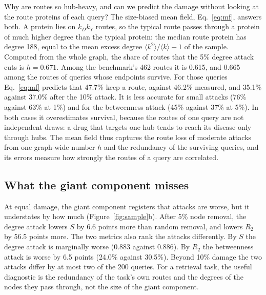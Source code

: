 Why are routes so hub-heavy, and can we predict the damage without looking at
the route proteins of each query? The size-biased mean field, Eq.~\eqref{eq:mf},
answers both. A protein lies on $k_D k_Y$ routes, so the typical route passes
through a protein of much higher degree than the typical protein: the median
route protein has degree 188, equal to the mean excess degree
$\langle k^2\rangle/\langle k\rangle-1$ of the sample. Computed from the whole
graph, the share of routes that the 5\% degree attack cuts is $h=0.671$. Among
the benchmark's 462 routes it is 0.615, and 0.665 among the routes of queries
whose endpoints survive. For those queries Eq.~\eqref{eq:mf} predicts that
47.7\% keep a route, against 46.2\% measured, and 35.1\% against 37.0\% after
the 10\% attack. It is less accurate for small attacks (76\% against 63\% at
1\%) and for the betweenness attack (45\% against 37\% at 5\%). In both cases it
overestimates survival, because the routes of one query are not independent
draws: a drug that targets one hub tends to reach its disease only through
hubs. The mean field thus captures the
route loss of moderate attacks from one graph-wide number $h$ and the
redundancy of the surviving queries, and its errors measure how strongly the
routes of a query are correlated.

\subsection{What the giant component misses}
\label{sec:targeted-proxy}

At equal damage, the giant component registers that attacks are worse, but it
understates by how much (Figure~\ref{fig:sample}b). After 5\% node removal, the
degree attack lowers $S$ by 6.6 points more than random removal, and lowers
$R_2$ by 56.5 points more. The two metrics also rank the attacks differently. By
$S$ the degree attack is marginally worse (0.883 against 0.886). By $R_2$ the
betweenness attack is worse by 6.5 points (24.0\% against 30.5\%). Beyond 10\%
damage the two attacks differ by at most two of the 200 queries. For a retrieval
task, the useful diagnostic is the redundancy of the task's own routes and the
degrees of the nodes they pass through, not the size of the giant component.
